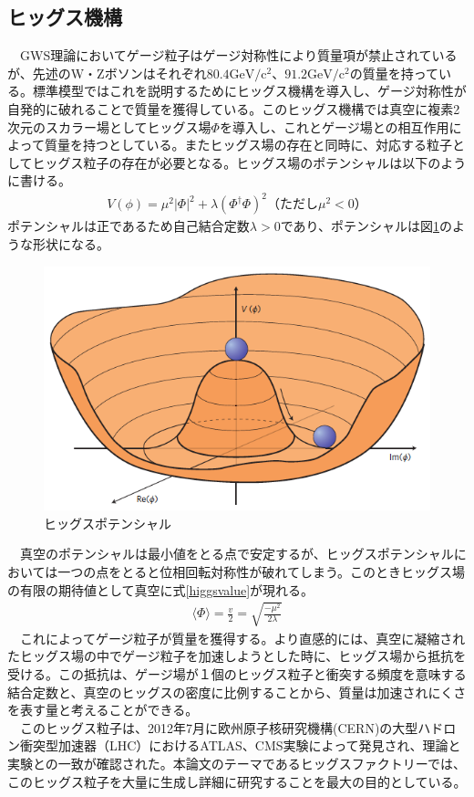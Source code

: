 \subsection{ヒッグス機構}
　GWS理論においてゲージ粒子はゲージ対称性により質量項が禁止されているが、先述のW・Zボソンはそれぞれ$80.4\mathrm{GeV/c^2}$、$91.2\mathrm{GeV/c^2}$の質量を持っている。標準模型ではこれを説明するためにヒッグス機構を導入し、ゲージ対称性が自発的に破れることで質量を獲得している。このヒッグス機構では真空に複素2次元のスカラー場としてヒッグス場$\Phi$を導入し、これとゲージ場との相互作用によって質量を持つとしている。またヒッグス場の存在と同時に、対応する粒子としてヒッグス粒子の存在が必要となる。ヒッグス場のポテンシャルは以下のように書ける。
\begin{align}
V(\phi) = {\mu}^2{|\Phi|}^2 + \lambda ({\Phi}^\dag \Phi)^2　（ただし{\mu}^2 < 0）
\end{align}
ポテンシャルは正であるため自己結合定数$\lambda > 0$であり、ポテンシャルは図\ref{higgspotential}のような形状になる。\\
\begin{figure}[h]
	\begin{center}
 \includegraphics[keepaspectratio, scale=0.3]
 	{Figure/Introduction/higgspotential.png}
 		\caption{ヒッグスポテンシャル}
 		\label{higgspotential}
	\end{center}
\end{figure}
　真空のポテンシャルは最小値をとる点で安定するが、ヒッグスポテンシャルにおいては一つの点をとると位相回転対称性が破れてしまう。このときヒッグス場の有限の期待値として真空に式\ref{higgsvalue}が現れる。\\
\begin{align}
\label{higgsvalue}
\langle \Phi \rangle = \frac{v}{2} = \sqrt{\frac{-{\mu}^2}{2\lambda}}
\end{align}
　これによってゲージ粒子が質量を獲得する。より直感的には、真空に凝縮されたヒッグス場の中でゲージ粒子を加速しようとした時に、ヒッグス場から抵抗を受ける。この抵抗は、ゲージ場が１個のヒッグス粒子と衝突する頻度を意味する結合定数と、真空のヒッグスの密度に比例することから、質量は加速されにくさを表す量と考えることができる。\\
　このヒッグス粒子は、2012年7月に欧州原子核研究機構(CERN)の大型ハドロン衝突型加速器（LHC）におけるATLAS、CMS実験によって発見され、理論と実験との一致が確認された。本論文のテーマであるヒッグスファクトリーでは、このヒッグス粒子を大量に生成し詳細に研究することを最大の目的としている。\\
